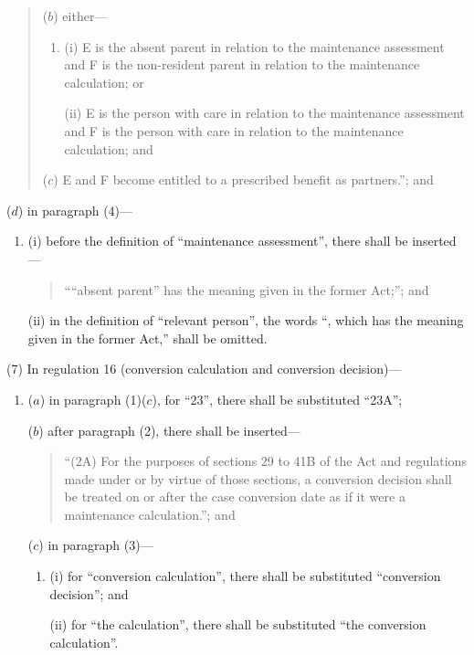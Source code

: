 \documentclass[12pt,a4paper]{article}
\begin{document}
\begin{enumerate}
\begin{quotation}
\begin{enumerate}
($b$) either—
\begin{enumerate}\item[]
(i) E is the absent parent in relation to the maintenance assessment and F is the non-resident parent in relation to the maintenance calculation; or

(ii) E is the person with care in relation to the maintenance assessment and F is the person with care in relation to the maintenance calculation; and
\end{enumerate}

($c$) E and F become entitled to a prescribed benefit as partners.”; and
\end{enumerate}
\end{quotation}

($d$) in paragraph (4)—
\begin{enumerate}\item[]
(i) before the definition of “maintenance assessment”, there shall be inserted—
\begin{quotation}
““absent parent” has the meaning given in the former Act;”; and
\end{quotation}

(ii) in the definition of “relevant person”, the words “, which has the meaning given in the former Act,” shall be omitted.
\end{enumerate}
\end{enumerate}

(7) In regulation 16 (conversion calculation and conversion decision)—
\begin{enumerate}\item[]
($a$) in paragraph (1)($c$), for “23”, there shall be substituted “23A”;

($b$) after paragraph (2), there shall be inserted—
\begin{quotation}
“(2A) For the purposes of sections 29 to 41B of the Act and regulations made under or by virtue of those sections, a conversion decision shall be treated on or after the case conversion date as if it were a maintenance calculation.”; and
\end{quotation}

($c$) in paragraph (3)—
\begin{enumerate}\item[]
(i) for “conversion calculation”, there shall be substituted “conversion decision”; and

(ii) for “the calculation”, there shall be substituted “the conversion calculation”.
\end{enumerate}
\end{enumerate}
\end{document}
